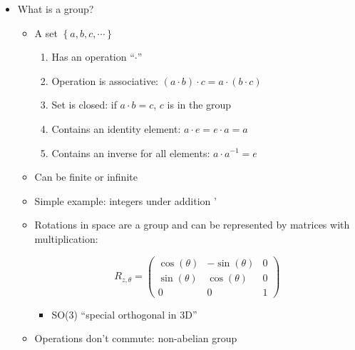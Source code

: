 \begin{itemize}
\begin{itemize}
    \end{itemize}

  \item What is a group?

    \begin{itemize}

      \item A set $\left\{ a,b,c,\cdots \right\}$

        \begin{enumerate}

          \item Has an operation ``$\cdot$''

          \item Operation is associative: $(a\cdot b)\cdot c=a\cdot (b\cdot c)$

          \item Set is closed: if $a\cdot b=c$, $c$ is in the group

          \item Contains an identity element: $a\cdot e=e\cdot a=a$

          \item Contains an inverse for all elements: $a\cdot a^{-1}=e$

        \end{enumerate}

      \item Can be finite or infinite

      \item Simple example: integers under addition
        '
      \item Rotations in space are a group and can be represented by matrices with multiplication:

        $$R_{z,\theta}=\left( \begin{array}{ccc} \cos(\theta) & -\sin(\theta) & 0 \\ \sin(\theta) & \cos(\theta) & 0 \\ 0 & 0 & 1 \end{array}\right)$$

        \begin{itemize}

          \item SO(3) ``special orthogonal in 3D''

        \end{itemize}

      \item Operations don't commute: non-abelian group


\end{itemize}
\end{itemize}
